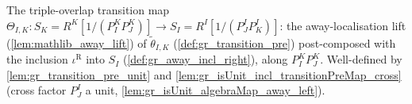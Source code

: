 \begin{definition}

  \label{def:gr_cocycle_theta_ik}
  The triple-overlap transition map
  \(\Theta_{I,K} : S_K = R^K[1/(P^K_I P^K_J)] \to S_I = R^I[1/(P^I_J P^I_K)]\):
  the away-localisation lift (\cref{lem:mathlib_away_lift}) of
  \(\tilde\theta_{I,K}\) (\cref{def:gr_transition_pre}) post-composed with the
  inclusion \(\iota^{\mathrm{R}}\) into \(S_I\) (\cref{def:gr_away_incl_right}),
  along \(P^K_I P^K_J\). Well-defined by \cref{lem:gr_transition_pre_unit} and
  \cref{lem:gr_isUnit_incl_transitionPreMap_cross} (cross factor \(P^I_J\) a
  unit, \cref{lem:gr_isUnit_algebraMap_away_left}).
\end{definition}

